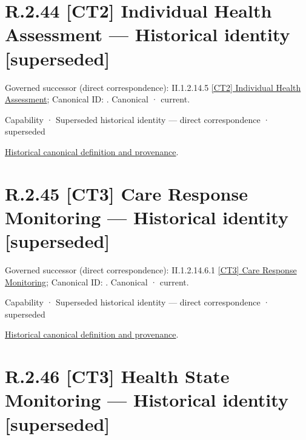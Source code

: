 \section*{R.2.44 [CT2] Individual Health Assessment — Historical identity [superseded]}
\label{navigation:R.2.44}

{\small Governed successor (direct correspondence): II.1.2.14.5 \hyperref[element:045f819bb3694d3c9db7f20886e2993f]{[CT2] Individual Health Assessment}; Canonical ID: \texttt{}. Canonical · current.}\par
\label{element:9111446aa2d045bd9acd98542b0eef1f}
{\small Capability · Superseded historical identity — direct correspondence · superseded}\par
\href{../../../../continuum/strategy/capability/9111446aa2d045bd9acd98542b0eef1f.md}{Historical canonical definition and provenance}.\par
\section*{R.2.45 [CT3] Care Response Monitoring — Historical identity [superseded]}
\label{navigation:R.2.45}

{\small Governed successor (direct correspondence): II.1.2.14.6.1 \hyperref[element:d6951c9357fa40a4943cde581d95d5b1]{[CT3] Care Response Monitoring}; Canonical ID: \texttt{}. Canonical · current.}\par
\label{element:615f93d05fbb4a8481f07778bd4f4803}
{\small Capability · Superseded historical identity — direct correspondence · superseded}\par
\href{../../../../continuum/strategy/capability/615f93d05fbb4a8481f07778bd4f4803.md}{Historical canonical definition and provenance}.\par
\section*{R.2.46 [CT3] Health State Monitoring — Historical identity [superseded]}
\label{navigation:R.2.46}

